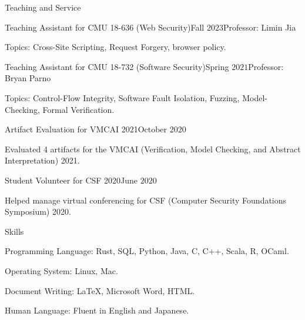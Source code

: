 \documentclass{resume} %
\begin{document}
\begin{rSection}{Teaching and Service}
  \begin{rSubsection}{Teaching Assistant for CMU 18-636 (Web
      Security)}{Fall $2023$}{Professor: Limin Jia}{}
  \item Topics: Cross-Site Scripting, Request Forgery, browser policy.
  \end{rSubsection}

  \begin{rSubsection}{Teaching Assistant for CMU 18-732 (Software
      Security)}{Spring $2021$}{Professor: Bryan Parno}{}
  \item Topics: Control-Flow Integrity, Software Fault Isolation,
    Fuzzing, Model-Checking, Formal Verification.
  \end{rSubsection}

  \begin{rSubsection}{Artifact Evaluation for VMCAI 2021}{October $2020$}
    {}{}
  \item Evaluated 4 artifacts for the VMCAI (Verification, Model
    Checking, and Abstract Interpretation) 2021.
  \end{rSubsection}

  \begin{rSubsection}{Student Volunteer for CSF 2020}{June $2020$}
    {}{}
  \item Helped manage virtual conferencing for CSF
    (Computer Security Foundations Symposium) 2020.
  \end{rSubsection}
\end{rSection}

\begin{rSection}{Skills}
  \begin{rSubsection}{}{}{}{}
  \item Programming Language: Rust, SQL, Python, Java, C, C++, Scala, R, OCaml.
  \item Operating System: Linux, Mac.
  \item Document Writing: LaTeX, Microsoft Word, HTML.
  \item Human Language: Fluent in English and Japanese.
  \end{rSubsection}
\end{rSection}
\end{document}
